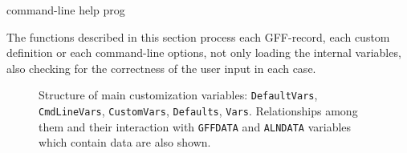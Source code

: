 \documentclass[11pt]{article}
\def\nwendcode{\endtrivlist \endgroup} %
\let\nwdocspar=\par                    %
\begin{document}
\LA{}command-line help prog~{\nwtagstyle{}}\RA{}
\nwendcode{}\nwdocspar


\newpage


The functions described in this section process each GFF-record, each custom definition or each command-line options, not only loading the internal variables, also checking for the correctness of the user input in each case.

\label{todo:BBB}
\nwenddocs{}%
%
%
\nwdocspar
\nwenddocs{}%
%
\nwdocspar
\todo{ \item \todoBBB } %
\begin{figure}[!ht]
\begin{center}
\fbox{\parbox[c][8cm][c]{\linewidth}{\hfill}}
\caption[Structure of main customization variables]{\label{fig:customvarstruc} Structure of main customization variables: {\tt{}{}DefaultVars}, {\tt{}{}CmdLineVars}, {\tt{}{}CustomVars}, {\tt{}{}Defaults}, {\tt{}{}Vars}. Relationships among them and their interaction with {\tt{}{}GFF{}DATA} and {\tt{}{}ALN{}DATA} variables which contain data are also shown.}
\end{center}
\end{figure}
\end{document}
